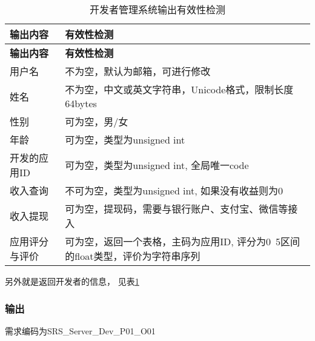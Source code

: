 \begin{longtable}{|p{7cm}|p{7cm}|}
\caption{开发者管理系统输出有效性检测}\label{tab:concrete_dev_sys_output_valid} \\
\hline
\textbf{输出内容} & \textbf{有效性检测} \\
\hline
\endfirsthead
\hline
\textbf{输出内容} & \textbf{有效性检测} \\
\hline
\endhead
\hline 
\endfoot
\hline
\endlastfoot

用户名 & 不为空，默认为邮箱，可进行修改 \\
姓名 & 不为空，中文或英文字符串，Unicode格式，限制长度64bytes \\
性别 & 可为空，男/女 \\
年龄 & 可为空，类型为unsigned int \\
开发的应用ID & 可为空，类型为unsigned int, 全局唯一code \\
收入查询 & 不可为空，类型为unsigned int, 如果没有收益则为0 \\
收入提现 & 可为空，提现码，需要与银行账户、支付宝、微信等接入 \\
应用评分与评价 & 可为空，返回一个表格，主码为应用ID, 评分为0~5区间的float类型，评价为字符串序列 \\

\end{longtable}


另外就是返回开发者的信息，
见表\ref{tab:concrete_dev_sys_output_valid}

\subsubsection{输出}

需求编码为SRS\_Server\_Dev\_P01\_O01

